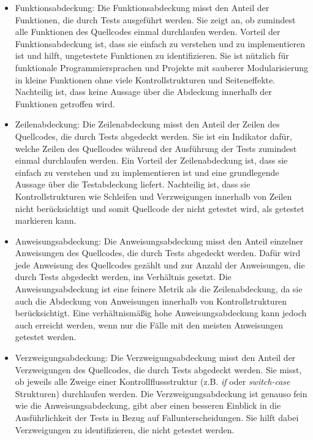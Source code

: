 \begin{itemize}
    \item 
    Funktionsabdeckung: Die Funktionsabdeckung misst den Anteil der Funktionen, die durch Tests ausgeführt werden.
    Sie zeigt an, ob zumindest alle Funktionen des Quellcodes einmal durchlaufen werden.
    Vorteil der Funktionsabdeckung ist, dass sie einfach zu verstehen und zu implementieren ist und hilft, ungetestete Funktionen zu identifizieren.
    Sie ist nützlich für funktionale Programmiersprachen und Projekte mit sauberer Modularisierung in kleine Funktionen ohne viele Kontrollstrukturen und Seiteneffekte.
    Nachteilig ist, dass keine Aussage über die Abdeckung innerhalb der Funktionen getroffen wird.
    \item
    Zeilenabdeckung: Die Zeilenabdeckung misst den Anteil der Zeilen des Quellcodes, die durch Tests abgedeckt werden.
    Sie ist ein Indikator dafür, welche Zeilen des Quellcodes während der Ausführung der Tests zumindest einmal durchlaufen werden.
    Ein Vorteil der Zeilenabdeckung ist, dass sie einfach zu verstehen und zu implementieren ist und eine grundlegende Aussage über die Testabdeckung liefert.
    Nachteilig ist, dass sie Kontrollstrukturen wie Schleifen und Verzweigungen innerhalb von Zeilen nicht berücksichtigt und somit Quellcode der nicht getestet wird, als getestet markieren kann.
    \item
    Anweisungsabdeckung: Die Anweisungsabdeckung misst den Anteil einzelner Anweisungen des Quellcodes, die durch Tests abgedeckt werden.
    Dafür wird jede Anweisung des Quellcodes gezählt und zur Anzahl der Anweisungen, die durch Tests abgedeckt werden, ins Verhältnis gesetzt.
    Die Anweisungsabdeckung ist eine feinere Metrik als die Zeilenabdeckung, da sie auch die Abdeckung von Anweisungen innerhalb von Kontrollstrukturen berücksichtigt.
    Eine verhältnismäßig hohe Anweisungsabdeckung kann jedoch auch erreicht werden, wenn nur die Fälle mit den meisten Anweisungen getestet werden.
    \item 
    Verzweigungsabdeckung: Die Verzweigungsabdeckung misst den Anteil der Verzweigungen des Quellcodes, die durch Tests abgedeckt werden.
    Sie misst, ob jeweils alle Zweige einer Kontrollflussstruktur (z.B. \textit{if} oder \textit{switch-case} Strukturen) durchlaufen werden.
    Die Verzweigungsabdeckung ist genauso fein wie die Anweisungsabdeckung, gibt aber einen besseren Einblick in die Ausführlichkeit der Tests in Bezug auf Fallunterscheidungen.
    Sie hilft dabei Verzweigungen zu identifizieren, die nicht getestet werden.

\end{itemize}
